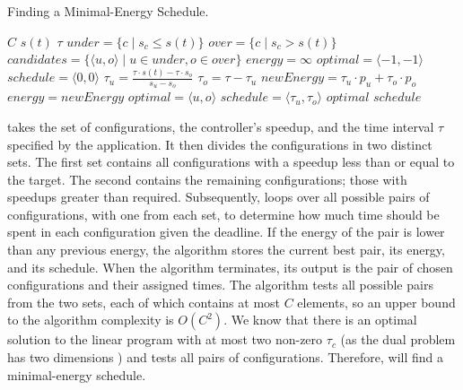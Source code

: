 \begin{algorithm}[t]
  \caption{Finding a Minimal-Energy Schedule.}
  \begin{algorithmic}
    \footnotesize
    \Require $C$ 
    \Require $s(t)$ 
    \Require $\tau$ 
  \State $under = \{c \mid s_c \le s(t) \}$
    \State $over = \{c \mid s_c > s(t)\}$
    \State $candidates = \{\langle u,o \rangle \mid u \in under, o \in over\}$
    \State $energy = \infty$
    \State $optimal = \langle -1,-1 \rangle$
    \State $schedule = \langle 0,0 \rangle$ \newline
     
    \State $\tau_u = \frac{\tau \cdot s(t) - \tau \cdot s_o}{s_u -s_o}$
    \State $\tau_o = \tau - \tau_u$
    \State $newEnergy = \tau_u \cdot p_u + \tau_o \cdot p_o$
    \State $energy = newEnergy$
    \State $optimal = \langle u,o \rangle$
    \State $schedule = \langle \tau_u,\tau_o \rangle$
    \EndIf
    \EndFor \newline \newline
    \Return $optimal$  \newline
    \Return $schedule$ 
  \end{algorithmic}
  \label{algo:poet-optimal}
\end{algorithm}

 takes the set of configurations, the controller's speedup, and the time interval $\tau$ specified by the application.
It then divides the configurations in two distinct sets.
The first set contains all configurations with a speedup less than or equal to the target.
The second contains the remaining configurations; \ie those with speedups greater than required.
Subsequently,  loops over all possible pairs of configurations, with one from each set, to determine how much time should be spent in each configuration given the deadline.
If the energy of the pair is lower than any previous energy, the algorithm stores the current best pair, its energy, and its schedule.
When the algorithm terminates, its output is the pair of chosen configurations and their assigned times.
The algorithm tests all possible pairs from the two sets, each of which contains at most $C$ elements, so an upper bound to the algorithm complexity is $O(C^2)$.
We know that there is an optimal solution to the linear program with at most two non-zero $\tau_c$ (as the dual problem has two dimensions \cite{LP}) and  tests all pairs of configurations.
Therefore,  will find a minimal-energy schedule.



